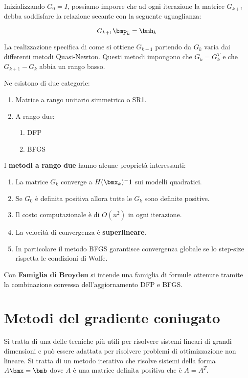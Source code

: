 \documentclass[\main/main.tex]{subfiles}
\begin{document}
Inizializzando \(G_0 = I\), possiamo imporre che ad ogni iterazione la matrice \(G_{k+1}\) debba soddisfare la relazione secante con la seguente uguaglianza:

\[
    G_{k+1}\bmp_k = \bmh_k
\]

La realizzazione specifica di come si ottiene \(G_{k+1}\) partendo da \(G_k\) varia dai differenti metodi Quasi-Newton. Questi metodi impongono che \(G_k = G_k^T\) e che \(G_{k+1} - G_k\) abbia un rango basso.

Ne esistono di due categorie:

\begin{enumerate}
    \item Matrice a rango unitario simmetrico o SR1.
    \item A rango due:
          \begin{enumerate}
              \item DFP
              \item BFGS
          \end{enumerate}
\end{enumerate}

I \textbf{metodi a rango due} hanno alcune proprietà interessanti:

\begin{enumerate}
    \item La matrice \(G_k\) converge a \(H(\bmx_k)^-1\) sui modelli quadratici.
    \item Se \(G_0\) è definita positiva allora tutte le \(G_k\) sono definite positive.
    \item Il costo computazionale è di \(O(n^2)\) in ogni iterazione.
    \item La velocità di convergenza è \textbf{superlineare}.
    \item In particolare il metodo BFGS garantisce convergenza globale se lo step-size rispetta le condizioni di Wolfe.
\end{enumerate}

Con \textbf{Famiglia di Broyden} si intende una famiglia di formule ottenute tramite la combinazione convessa dell'aggiornamento DFP e BFGS.

\section{Metodi del gradiente coniugato}
Si tratta di una delle tecniche più utili per risolvere sistemi lineari di grandi dimensioni e può essere adattata per risolvere problemi di ottimizzazione non lineare. Si tratta di un metodo iterativo che risolve sistemi della forma \(A\bmx = \bmb \) dove \(A\) è una matrice definita positiva che è \(A=A^T\).
\end{document}
